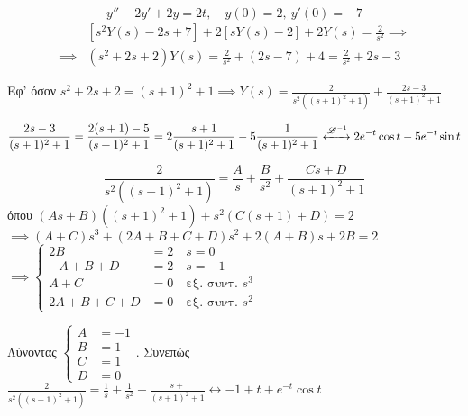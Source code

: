 \documentclass[11pt,a4paper,titlepage,final]{article}
\begin{document}
\begin{exercise*}{12.9}
	\[
	y''-2y'+2y=2t,\quad y(0) = 2, \ y'(0) = -7
	\]
	\tcblower
	\begin{align*}
	& \left[s^2Y(s)-2s+7\right]+2\left[sY(s)-2\right]+2Y(s) = \frac{2}{s^2} \implies \\
	\implies & (s^2+2s+2)Y(s) = \frac{2}{s^2}+(2s-7)+4=\frac{2}{s^2}+2s -3
	\end{align*}

	Εφ' όσον \( s^2+2s+2 =(s+1)^2+1 \implies Y(s) = \frac{2}{s^2\left((s+1)^2+1\right)}
	+\frac{2s-3}{(s+1)^2+1}
	\)

	\[
	\frac{2s-3}{(s+1)^2+1} = \frac{2(s+1)-5}{(s+1)^2+1}=2\frac{s+1}{(s+1)^2+1}-5\frac{1}{(s+1)^2+1}
	\xleftrightarrow{\mathscr L^{-1}}2e^{-t}\cos t-5e^{-t}\sin t
	\]

	\[
	\frac{2}{s^2\left((s+1)^2+1\right)} = \frac{A}{s} + \frac{B}{s^2} + \frac{Cs+D}{(s+1)^2+1}
	\]
	όπου \( (As+B)\left((s+1)^2+1\right) + s^2\left(C(s+1)+D\right) =2 \) \\
	\( \implies (A+C)s^3+(2A+B+C+D)s^2 + 2(A+B)s+2B = 2 \) \\
	\( \implies \begin{cases}
	2B&= 2 \quad s = 0\\
	-A+B+D &= 2 \quad s = -1 \\
	A+C &= 0 \quad \text{εξ. συντ. } s^3 \\
	2A+B+C+D &=0 \quad \text{εξ. συντ. } s^2
	\end{cases} \)

	Λύνοντας \(
	\begin{cases}
	A &= -1 \\ B &= 1 \\ C &= 1 \\ D &= 0
	\end{cases}
	 \). Συνεπώς \( \frac{2}{s^2\left((s+1)^2+1\right)} = \frac{1}{s}+\frac{1}{s^2}+ \frac{s+}{(s+1)^2+1}
	 \leftrightarrow -1+t+e^{-t}\cos t
	 \)
\end{exercise*}
\end{document}
